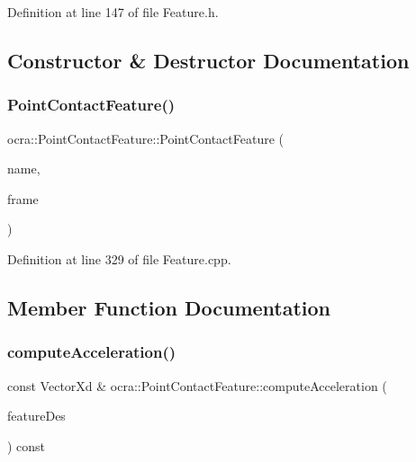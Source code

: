 Definition at line 147 of file Feature.\+h.



\subsection{Constructor \& Destructor Documentation}
\hypertarget{classocra_1_1PointContactFeature_aeaaae6acc15b47e89210b57dd34b3f73}{}\label{classocra_1_1PointContactFeature_aeaaae6acc15b47e89210b57dd34b3f73} 
\subsubsection{\texorpdfstring{Point\+Contact\+Feature()}{PointContactFeature()}}
{\footnotesize\ttfamily ocra\+::\+Point\+Contact\+Feature\+::\+Point\+Contact\+Feature (\begin{DoxyParamCaption}\item[{const std\+::string \&}]{name,  }\item[{Control\+Frame\+::\+Ptr}]{frame }\end{DoxyParamCaption})}



Definition at line 329 of file Feature.\+cpp.



\subsection{Member Function Documentation}
\hypertarget{classocra_1_1PointContactFeature_ab8f6f7f395e2dc59d74c0676206b12bb}{}\label{classocra_1_1PointContactFeature_ab8f6f7f395e2dc59d74c0676206b12bb} 
\subsubsection{\texorpdfstring{compute\+Acceleration()}{computeAcceleration()}\hspace{0.1cm}{\footnotesize\ttfamily [1/2]}}
{\footnotesize\ttfamily const Vector\+Xd \& ocra\+::\+Point\+Contact\+Feature\+::compute\+Acceleration (\begin{DoxyParamCaption}\item[{const \hyperlink{classocra_1_1Feature}{Feature} \&}]{feature\+Des }\end{DoxyParamCaption}) const\hspace{0.3cm}{\ttfamily [virtual]}}



